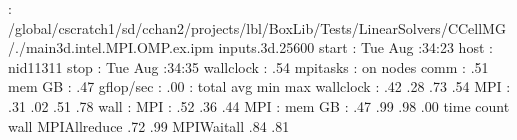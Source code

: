 \documentclass[letterpaper,10pt,english]{sphinxmanual}
\begin{document}
\begin{sphinxVerbatim}[commandchars=\\\{\}]
   : /global/cscratch1/sd/cchan2/projects/lbl/BoxLib/Tests/LinearSolvers/C\PYGZus{}CellMG/./main3d.intel.MPI.OMP.ex.ipm inputs.3d.25600
start     : Tue Aug  :34:23    host      : nid11311
stop      : Tue Aug  :34:35    wallclock : .54
mpi\PYGZus{}tasks :  on  nodes            \PYGZpc{}comm     : .51
mem \PYG{o}{[}GB\PYG{o}{]}  : .47                     gflop/sec : .00
:       \PYG{o}{[}total\PYG{o}{]}        \PYGZlt{}avg\PYGZgt{}          min          max
wallclock :       .42         .28         .73        .54
MPI       :        .31         .02         .51         .78
\PYGZpc{}wall     :
MPI     :                      .52        .36        .44
MPI     :                               
mem \PYG{o}{[}GB\PYG{o}{]}  :        .47         .99         .98         .00
\PYG{o}{[}time\PYG{o}{]}        \PYG{o}{[}count\PYG{o}{]}        \PYGZlt{}\PYGZpc{}wall\PYGZgt{}
MPI\PYGZus{}Allreduce               .72                   .99
MPI\PYGZus{}Waitall                  .84                    .81

\end{sphinxVerbatim}
\end{document}
